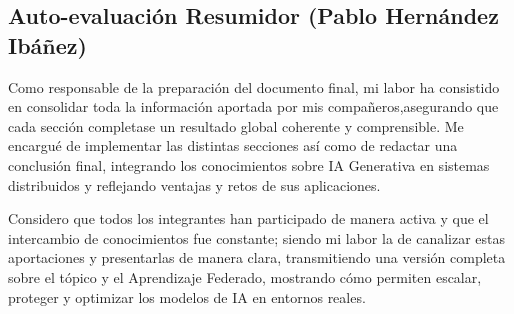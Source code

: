 \documentclass[runningheads]{llncs}
\begin{document}
\subsection{Auto-evaluación Resumidor (Pablo Hernández Ibáñez)}

Como responsable de la preparación del documento final, mi labor ha consistido en consolidar toda la información aportada por mis compañeros,asegurando que cada sección completase un resultado global coherente y comprensible. Me encargué de implementar las distintas secciones así como de redactar una conclusión final, integrando los conocimientos sobre IA Generativa en sistemas distribuidos y reflejando ventajas y retos de sus aplicaciones.

Considero que todos los integrantes han participado de manera activa y que el intercambio de conocimientos fue constante; siendo mi labor la de canalizar estas aportaciones y presentarlas de manera clara, transmitiendo una versión completa sobre el tópico y el Aprendizaje Federado, mostrando cómo permiten escalar, proteger y optimizar los modelos de IA en entornos reales.
\end{document}
